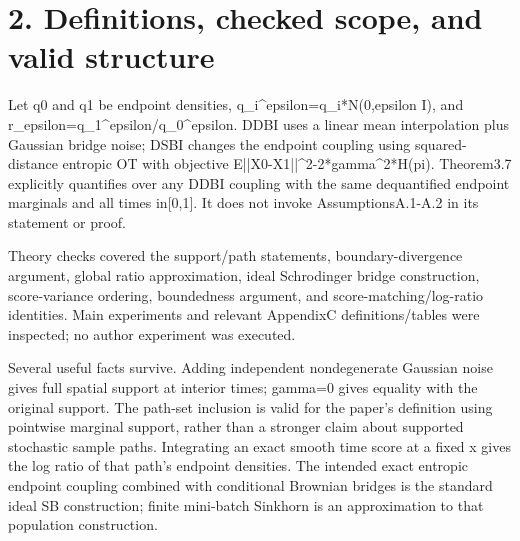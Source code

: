 \documentclass[10pt]{article}
\begin{document}
\section*{2. Definitions, checked scope, and valid structure}
Let q0 and q1 be endpoint densities, q\_i\textasciicircum{}epsilon=q\_i*N(0,epsilon I), and r\_epsilon=q\_1\textasciicircum{}epsilon/q\_0\textasciicircum{}epsilon. DDBI uses a linear mean interpolation plus Gaussian bridge noise; DSBI changes the endpoint coupling using squared-distance entropic OT with objective E||X0-X1||\textasciicircum{}2-2*gamma\textasciicircum{}2*H(pi). Theorem3.7 explicitly quantifies over any DDBI coupling with the same dequantified endpoint marginals and all times in[0,1]. It does not invoke AssumptionsA.1-A.2 in its statement or proof.\par
Theory checks covered the support/path statements, boundary-divergence argument, global ratio approximation, ideal Schrodinger bridge construction, score-variance ordering, boundedness argument, and score-matching/log-ratio identities. Main experiments and relevant AppendixC definitions/tables were inspected; no author experiment was executed.\par
Several useful facts survive. Adding independent nondegenerate Gaussian noise gives full spatial support at interior times; gamma=0 gives equality with the original support. The path-set inclusion is valid for the paper’s definition using pointwise marginal support, rather than a stronger claim about supported stochastic sample paths. Integrating an exact smooth time score at a fixed x gives the log ratio of that path’s endpoint densities. The intended exact entropic endpoint coupling combined with conditional Brownian bridges is the standard ideal SB construction; finite mini-batch Sinkhorn is an approximation to that population construction.\par
\end{document}
